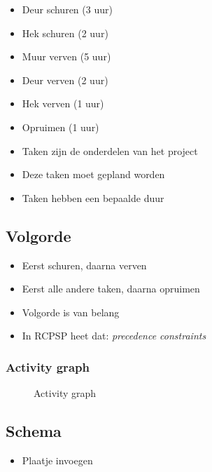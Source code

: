 \documentclass{beamer}
\theoremstyle{definition}
\newcommand{\inputtikz}[1]{}
\begin{document}
\begin{frame}
	\begin{itemize}
		\item Deur schuren (3 uur)
		\item Hek schuren (2 uur)
		\item<2-> Muur verven (5 uur)
		\item<2-> Deur verven (2 uur)
		\item<2-> Hek verven (1 uur)
		\item<3-> Opruimen (1 uur)
	\end{itemize}
\end{frame}

\begin{frame}
	\begin{itemize}
		\item Taken zijn de onderdelen van het project
		\item Deze taken moet gepland worden
		\item Taken hebben een bepaalde duur
	\end{itemize}
\end{frame}

\subsection{Volgorde}
\begin{frame}
	\begin{itemize}
		\item Eerst schuren, daarna verven
		\item Eerst alle andere taken, daarna opruimen
		\item Volgorde is van belang
		\item In RCPSP heet dat: \emph{precedence constraints}
	\end{itemize}
\end{frame}

\begin{frame}
	\frametitle{Activity graph}
	\vspace{-1em}
	\begin{figure}[ht]
		\makebox[\textwidth][c]{\resizebox{.8\paperwidth}{!}{
			\inputtikz{activity_graph_simple}
		}}
		\vspace{-1em}
		\caption{Activity graph}
		\label{fig:activity_graph}
	\end{figure}
\end{frame}

\subsection{Schema}
\begin{frame}
	\begin{itemize}
		\item Plaatje invoegen
	\end{itemize}
\end{frame}
\end{document}
